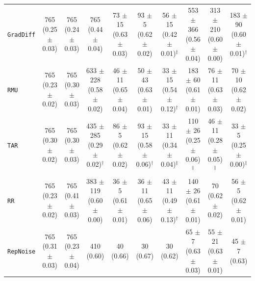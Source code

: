 \documentclass{article}
\theoremstyle{plain}
\theoremstyle{definition}
\theoremstyle{remark}
\begin{document}
\begin{table}[htbp]
\begin{sc}
{\begin{tabular}{lccccccccc}
\texttt{GradDiff} & 765 (0.25 $\pm$ 0.03) & 765 (0.24 $\pm$ 0.03) & 765 (0.44 $\pm$ 0.04) & 73 $\pm$ 15 (0.63 $\pm$ 0.03) & 93 $\pm$ 5 (0.62 $\pm$ 0.02) & 56 $\pm$ 15 (0.42 $\pm$ 0.01)$^{\ddagger}$ & 553 $\pm$ 366 (0.56 $\pm$ 0.04) & 313 $\pm$ 210 (0.60 $\pm$ 0.00) & 183 $\pm$ 90 (0.60 $\pm$ 0.01)$^{\dagger}$ \\
\texttt{RMU} & 765 (0.23 $\pm$ 0.02) & 765 (0.30 $\pm$ 0.03) & 633 $\pm$ 228 (0.58 $\pm$ 0.02) & 46 $\pm$ 11 (0.65 $\pm$ 0.04) & 50 $\pm$ 43 (0.63 $\pm$ 0.01) & 33 $\pm$ 15 (0.54 $\pm$ 0.12)$^{\dagger}$ & 183 $\pm$ 60 (0.61 $\pm$ 0.01) & 76 $\pm$ 11 (0.63 $\pm$ 0.03) & 70 $\pm$ 10 (0.62 $\pm$ 0.02) \\
\texttt{TAR} & 765 (0.30 $\pm$ 0.02) & 765 (0.30 $\pm$ 0.03) & 435 $\pm$ 285 (0.29 $\pm$ 0.02)$^{\dagger}$ & 86 $\pm$ 5 (0.62 $\pm$ 0.02) & 93 $\pm$ 15 (0.58 $\pm$ 0.06)$^{\dagger}$ & 33 $\pm$ 11 (0.34 $\pm$ 0.04)$^{\ddagger}$ & 110 $\pm$ 26 (0.25 $\pm$ 0.06)$^{\ddagger}$ & 46 $\pm$ 11 (0.28 $\pm$ 0.05)$^{\ddagger}$ & 33 $\pm$ 5 (0.25 $\pm$ 0.00)$^{\ddagger}$ \\
\texttt{RR} & 765 (0.23 $\pm$ 0.02) & 765 (0.41 $\pm$ 0.03) & 383 $\pm$ 119 (0.60 $\pm$ 0.00) & 36 $\pm$ 5 (0.61 $\pm$ 0.01) & 36 $\pm$ 11 (0.65 $\pm$ 0.06) & 43 $\pm$ 11 (0.49 $\pm$ 0.13)$^{\dagger}$ & 140 $\pm$ 26 (0.61 $\pm$ 0.01) & 70 (0.62 $\pm$ 0.02) & 56 $\pm$ 5 (0.62 $\pm$ 0.01) \\
\texttt{RepNoise} & 765 (0.31 $\pm$ 0.03) & 765 (0.23 $\pm$ 0.04) & 410 (0.60) & 40 (0.66) & 30 (0.67) & 30 (0.62) & 65 $\pm$ 7 (0.63 $\pm$ 0.03) & 55 $\pm$ 21 (0.63 $\pm$ 0.01) & 45 $\pm$ 7 (0.63) \\
\bottomrule
\end{tabular}
}
\end{sc}
\end{table}
\end{document}

